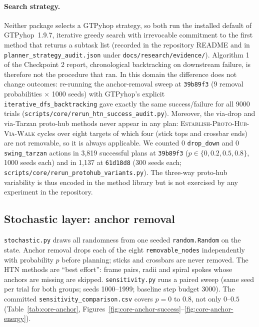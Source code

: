 \paragraph{Search strategy.} Neither package selects a GTPyhop strategy, so both run the installed
default of GTPyhop~1.9.7, iterative greedy search with irrevocable commitment to the first method that
returns a subtask list (recorded in the repository README and in
\texttt{planner\_strategy\_audit.json} under \texttt{docs/research/evidence/}). Algorithm 1 of the Checkpoint 2 report, chronological backtracking on downstream failure,
is therefore not the procedure that ran. In this domain the difference does not change outcomes: re-running
the anchor-removal sweep at \texttt{39b89f3} (9 removal probabilities $\times$ 1000 seeds) with GTPyhop's
explicit \texttt{iterative\_dfs\_backtracking} gave exactly the same success/failure for all 9000 trials
(\texttt{scripts/core/rerun\_htn\_success\_audit.py}). Moreover, the via-drop and via-Tarzan proto-hub
methods never appear in any plan: \textsc{Establish-Proto-Hub-Via-Walk} cycles over eight targets of which
four (stick tops and crossbar ends) are not removable, so it is always applicable. We counted 0
\texttt{drop\_down} and 0 \texttt{swing\_tarzan} actions in 3,819 successful plans at \texttt{39b89f3}
($p\in\{0,0.2,0.5,0.8\}$, 1000 seeds each) and in 1,137 at \texttt{61d18d8} (300 seeds each;
\texttt{scripts/core/rerun\_protohub\_variants.py}). The three-way proto-hub variability is thus encoded
in the method library but is not exercised by any experiment in the repository.

\FloatBarrier

\subsection{Stochastic layer: anchor removal}
\label{sec:core-anchor}

\texttt{stochastic.py} draws all randomness from one seeded \texttt{random.Random} on the state. Anchor
removal drops each of the eight \texttt{removable\_nodes} independently with probability $p$ before
planning; sticks and crossbars are never removed. The HTN methods are ``best effort'': frame pairs,
radii and spiral spokes whose anchors are missing are skipped. \texttt{sensitivity.py} runs a paired sweep
(same seed per trial for both groups; seeds 1000--1999; baseline step budget 3000). The committed
\texttt{sensitivity\_comparison.csv} covers $p=0$ to $0.8$, not only $0$--$0.5$
(Table~\ref{tab:core-anchor}, Figures~\ref{fig:core-anchor-success}--\ref{fig:core-anchor-energy}).

